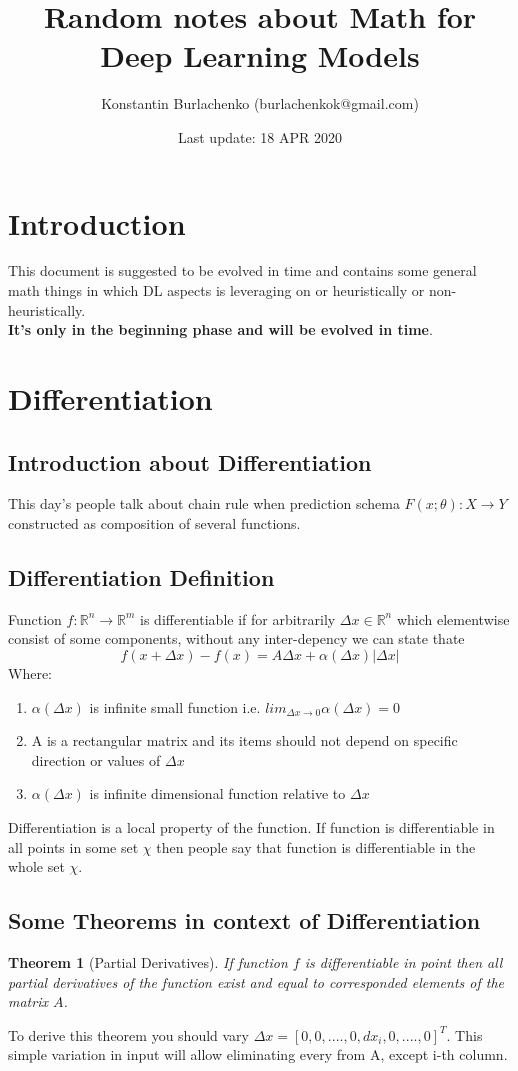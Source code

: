 \documentclass[12pt,a4paper]{article}
\title{Random notes about Math for Deep Learning Models}
\date{Last update: 18 APR 2020}
\author{Konstantin Burlachenko (burlachenkok@gmail.com)}
\theoremstyle{plain}
\newtheorem{theorem}{Theorem}[section]
\begin{document}
	
\maketitle
\tableofcontents
\section{Introduction}
This document is suggested to be evolved in time and contains some general math things in which DL aspects is leveraging on or heuristically or non-heuristically.\\
 \textbf{It's only in the beginning phase and will be evolved in time}.
\section{Differentiation}
\subsection{Introduction about Differentiation}
This day’s people talk about chain rule when prediction schema $F(x;\theta):X \to Y$ constructed as composition of several functions.
\subsection{Differentiation Definition}
Function $f:\mathbb{R}^{n} \rightarrow \mathbb{R}^{m}$ 
is differentiable if for arbitrarily $\varDelta x \in \mathbb{R}^{n}$ which elementwise consist of some components, without any inter-depency we can state thate 
\[f(x+\varDelta x)-f(x) = A \varDelta x + \alpha(\varDelta x)|\varDelta x| \]
Where:
\begin{enumerate}
 \item $\alpha(\varDelta x)$ is infinite small function i.e. $lim_{\varDelta x \rightarrow 0} \alpha(\varDelta x) = 0$
 \item A is a rectangular matrix and its items should not depend on specific direction or values of $\varDelta x$
 \item $\alpha(\varDelta x)$ is infinite dimensional function relative to $\varDelta x$
\end{enumerate}

Differentiation is a local property of the function. If function is differentiable in all points in some set $\chi$ then people say that function is differentiable in the whole set $\chi$.
\\
\subsection{Some Theorems in context of Differentiation}
\begin{theorem} [Partial Derivatives]
 If function $f$ is differentiable in point then all partial derivatives of the function exist and equal to corresponded elements of the matrix $A$.
\end{theorem}
To derive this theorem you should vary \textbf{$\varDelta x = [0, 0, ...., 0, dx_i, 0, ...., 0]^T$}.
This simple variation in input will allow eliminating every from A, except i-th column.
\end{document}
